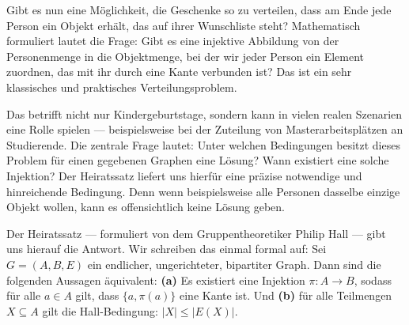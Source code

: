 \begin{spoken-clean}[01:07:08 - 01:08:20]
Gibt es nun eine Möglichkeit, die Geschenke so zu verteilen, dass am Ende jede Person ein Objekt erhält, das auf ihrer Wunschliste steht? Mathematisch formuliert lautet die Frage: Gibt es eine injektive Abbildung von der Personenmenge in die Objektmenge, bei der wir jeder Person ein Element zuordnen, das mit ihr durch eine Kante verbunden ist? Das ist ein sehr klassisches und praktisches Verteilungsproblem.
\end{spoken-clean}

\begin{spoken-clean}[01:08:20 - 01:09:40]
Das betrifft nicht nur Kindergeburtstage, sondern kann in vielen realen Szenarien eine Rolle spielen --- beispielsweise bei der Zuteilung von Masterarbeitsplätzen an Studierende. Die zentrale Frage lautet: Unter welchen Bedingungen besitzt dieses Problem für einen gegebenen Graphen eine Lösung? Wann existiert eine solche Injektion? Der Heiratssatz liefert uns hierfür eine präzise notwendige und hinreichende Bedingung. Denn wenn beispielsweise alle Personen dasselbe einzige Objekt wollen, kann es offensichtlich keine Lösung geben.
\end{spoken-clean}

\begin{ai-global-state-checkpoint-invisible-content}
\end{ai-global-state-checkpoint-invisible-content}

\begin{spoken-clean}[01:09:40 - 01:11:00]
Der Heiratssatz --- formuliert von dem Gruppentheoretiker Philip Hall --- gibt uns hierauf die Antwort. Wir schreiben das einmal formal auf: Sei $G = (A, B, E)$ ein endlicher, ungerichteter, bipartiter Graph. Dann sind die folgenden Aussagen äquivalent: \textbf{(a)} Es existiert eine Injektion $\pi \colon A \to B$, sodass für alle $a \in A$ gilt, dass $\{a, \pi(a)\}$ eine Kante ist. Und \textbf{(b)} für alle Teilmengen $X \subseteq A$ gilt die Hall-Bedingung: $|X| \le |E(X)|$.
\end{spoken-clean}

